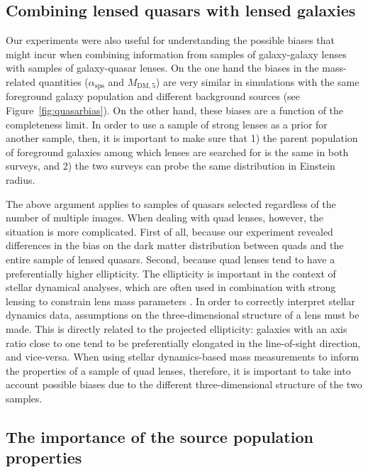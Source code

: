 \documentclass{aa}
\def\asps{\alpha_{\mathrm{sps}}}
\def\mdmfive{M_{\mathrm{DM}, 5}}
\def\Fref#1{Figure~\ref{#1}\xspace}
\begin{document}
\subsection{Combining lensed quasars with lensed galaxies}

Our experiments were also useful for understanding the possible biases that might incur when combining information from samples of galaxy-galaxy lenses with samples of galaxy-quasar lenses.
On the one hand the biases in the mass-related quantities ($\asps$ and $\mdmfive$) are very similar in simulations with the same foreground galaxy population and different background sources (see \Fref{fig:quasarbias}).
On the other hand, these biases are a function of the completeness limit. In order to use a sample of strong lenses as a prior for another sample, then, it is important to make sure that 1) the parent population of foreground galaxies among which lenses are searched for is the same in both surveys, and 2) the two surveys can probe the same distribution in Einstein radius.

The above argument applies to samples of quasars selected regardless of the number of multiple images.
When dealing with quad lenses, however, the situation is more complicated.
First of all, because our experiment revealed differences in the bias on the dark matter distribution between quads and the entire sample of lensed quasars.
Second, because quad lenses tend to have a preferentially higher ellipticity.
The ellipticity is important in the context of stellar dynamical analyses,
which are often used in combination with strong lensing to constrain lens mass parameters \citep[see e.g.][]{Yil++20}.
In order to correctly interpret stellar dynamics data, assumptions on the three-dimensional structure of a lens must be made.
This is directly related to the projected ellipticity: galaxies with an axis ratio close to one tend to be preferentially elongated in the line-of-sight direction, and vice-versa.
When using stellar dynamics-based mass measurements to inform the properties of a sample of quad lenses, therefore, it is important to take into account possible biases due to the different three-dimensional structure of the two samples.

\subsection{The importance of the source population properties}
\end{document}
